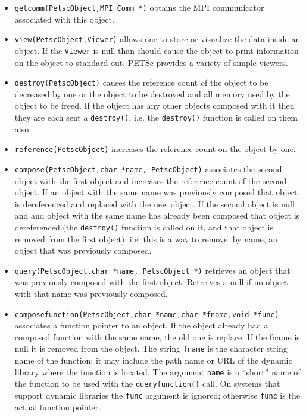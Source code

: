 \documentclass[twoside,12pt]{../sty/report_petsc}
\begin{document}
\begin{itemize}
\item {\tt getcomm(PetscObject,MPI\_Comm *)} obtains the MPI communicator associated
      with this object.

\item {\tt view(PetscObject,Viewer)} allows one to store or visualize the data inside
      an object. If the {\tt Viewer} is null than should cause the object to print 
      information on the object to standard out. PETSc provides a variety of simple
      viewers.

\item {\tt destroy(PetscObject)} causes the reference count of the object to be decreased
      by one or the object to be destroyed and all memory used by the object to be freed.
      If the object has any other objects composed with it then they are each sent a
      {\tt destroy()}, i.e. the {\tt destroy()} function is called on them also.

\item {\tt reference(PetscObject)} increases the reference count on the object by one.

\item {\tt compose(PetscObject,char *name, PetscObject)} associates the second object with 
      the first object and increases the reference count of the second object. If an
      object with the 
      same name was previously composed that object is dereferenced and replaced with 
      the new object. If the 
      second object is null and and object with the same name has already been 
      composed that object is dereferenced (the {\tt destroy()} function is called on 
      it, and that object is removed from the first object); i.e. this is a way to 
      remove, by name, an object that was previously composed. 

\item {\tt query(PetscObject,char *name, PetscObject *)} retrieves an object that was 
      previously composed with the first object. Retreives a null if no object with 
      that name was previously composed.

\item {\tt composefunction(PetscObject,char *name,char *fname,void *func)} associates a function
      pointer to an object. If the object already had a composed function with the 
      same name, the old one is replace. If the fname is null it is removed from 
      the object. The string {\tt fname} is the  character string name of the function;
      it may include the path name or URL of the dynamic library where the function is located.
      The argument {\tt name} is a ``short'' name of the function to be used with the 
      {\tt queryfunction()} call. On systems that support dynamic libraries the {\tt func}
      argument is ignored; otherwise {\tt func} is the actual function pointer.


\end{itemize}
\end{document}
